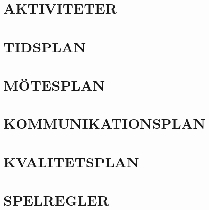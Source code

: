 \documentclass[a4paper]{article}
\begin{document}
\section{AKTIVITETER}
\label{sec:sktiviteter}



\section{TIDSPLAN}
\label{sec:tidsplan}



\section{MÖTESPLAN}
\label{sec:mötesplan}



\section{KOMMUNIKATIONSPLAN}
\label{sec:komm}



\section{KVALITETSPLAN}
\label{sec:kval}



\section{SPELREGLER}
\label{sec:spelregler}



%
%
\end{document}
